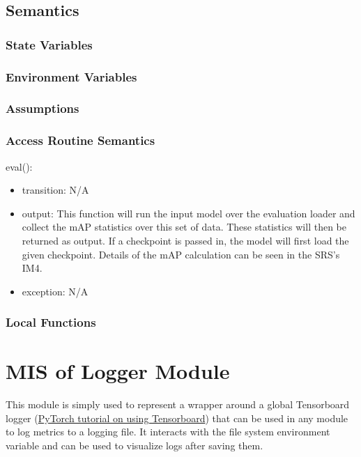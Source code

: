 \documentclass[12pt, titlepage]{article}
\begin{document}
\subsection{Semantics}

\subsubsection{State Variables}


\subsubsection{Environment Variables}


\subsubsection{Assumptions}

\subsubsection{Access Routine Semantics}
\noindent eval():
\begin{itemize}
\item transition: N/A 
\item output: This function will run the input model over the evaluation loader and collect the mAP statistics over this set of data. These statistics will then be returned as output. If a checkpoint is passed in, the model will first load the given checkpoint. Details of the mAP calculation can be seen in the SRS's IM4.
\item exception: N/A
\end{itemize}

\subsubsection{Local Functions}


\newpage

\section{MIS of Logger Module} \label{ModuleLog} 
This module is simply used to represent a wrapper around a global Tensorboard logger (\href{https://pytorch.org/tutorials/recipes/recipes/tensorboard_with_pytorch.html}{PyTorch tutorial on using Tensorboard})
that can be used in any module to log metrics to a logging file. It interacts with the file system environment variable and can be used to visualize logs after saving them.
\newpage
\end{document}
